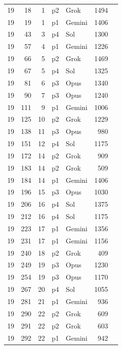 \begin{longtable}{r r r l l r L{2.2in}}
19 & 18 & 1 & p2 & Grok & 1494 &  \\
19 & 19 & 1 & p1 & Gemini & 1406 &  \\
19 & 43 & 3 & p4 & Sol & 1300 &  \\
19 & 57 & 4 & p1 & Gemini & 1226 &  \\
19 & 66 & 5 & p2 & Grok & 1469 &  \\
19 & 67 & 5 & p4 & Sol & 1325 &  \\
19 & 81 & 6 & p3 & Opus & 1340 &  \\
19 & 90 & 7 & p3 & Opus & 1240 &  \\
19 & 111 & 9 & p1 & Gemini & 1006 &  \\
19 & 125 & 10 & p2 & Grok & 1229 &  \\
19 & 138 & 11 & p3 & Opus & 980 &  \\
19 & 151 & 12 & p4 & Sol & 1175 &  \\
19 & 172 & 14 & p2 & Grok & 909 &  \\
19 & 183 & 14 & p2 & Grok & 509 &  \\
19 & 184 & 14 & p1 & Gemini & 1406 &  \\
19 & 196 & 15 & p3 & Opus & 1030 &  \\
19 & 206 & 16 & p4 & Sol & 1375 &  \\
19 & 212 & 16 & p4 & Sol & 1175 &  \\
19 & 223 & 17 & p1 & Gemini & 1356 &  \\
19 & 231 & 17 & p1 & Gemini & 1156 &  \\
19 & 240 & 18 & p2 & Grok & 409 &  \\
19 & 249 & 19 & p3 & Opus & 1230 &  \\
19 & 254 & 19 & p3 & Opus & 1170 &  \\
19 & 267 & 20 & p4 & Sol & 1055 &  \\
19 & 281 & 21 & p1 & Gemini & 936 &  \\
19 & 290 & 22 & p2 & Grok & 609 &  \\
19 & 291 & 22 & p2 & Grok & 603 &  \\
19 & 292 & 22 & p1 & Gemini & 942 &  \\

\end{longtable}

